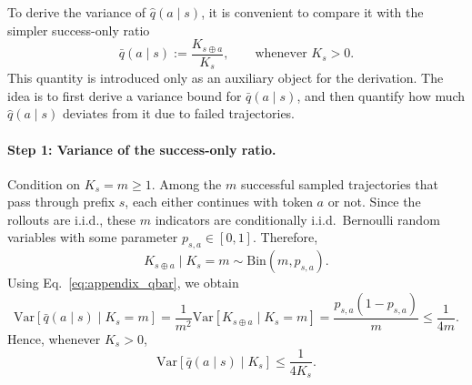 \documentclass{article}
\begin{document}
To derive the variance of $\widehat q(a \mid s)$, it is convenient to compare it with the simpler success-only ratio
\begin{equation}
\bar q(a \mid s)
:=
\frac{K_{s\oplus a}}{K_s},
\qquad \text{whenever } K_s>0.
\label{eq:appendix_qbar}
\end{equation}
This quantity is introduced only as an auxiliary object for the derivation. The idea is to first derive a variance bound for $\bar q(a \mid s)$, and then quantify how much $\widehat q(a \mid s)$ deviates from it due to failed trajectories.

\paragraph{Step 1: Variance of the success-only ratio.}
Condition on $K_s=m\ge 1$. Among the $m$ successful sampled trajectories that pass through prefix $s$, each either continues with token $a$ or not. Since the rollouts are i.i.d., these $m$ indicators are conditionally i.i.d.\ Bernoulli random variables with some parameter $p_{s,a}\in[0,1]$. Therefore,
\begin{equation}
K_{s\oplus a}\mid K_s=m \sim \mathrm{Bin}(m,p_{s,a}).
\label{eq:appendix_binomial}
\end{equation}
Using Eq.~\eqref{eq:appendix_qbar}, we obtain
\begin{equation}
\mathrm{Var}\!\left[\bar q(a \mid s)\mid K_s=m\right]
=
\frac{1}{m^2}\mathrm{Var}\!\left[K_{s\oplus a}\mid K_s=m\right]
=
\frac{p_{s,a}(1-p_{s,a})}{m}
\le
\frac{1}{4m}.
\end{equation}
Hence, whenever $K_s>0$,
\begin{equation}
\mathrm{Var}\!\left[\bar q(a \mid s)\mid K_s\right]
\le
\frac{1}{4K_s}.
\label{eq:appendix_qbar_variance}
\end{equation}
\end{document}
